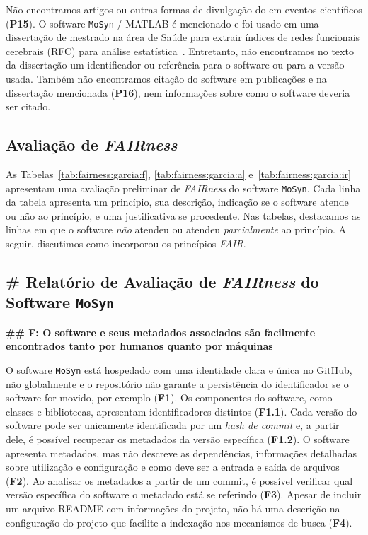 Não encontramos artigos ou outras formas de divulgação do \RSw em eventos científicos (\textbf{P15}). %
O software \texttt{MoSyn} / MATLAB é mencionado e foi usado em uma dissertação de mestrado na área de Saúde
para extrair índices de redes funcionais cerebrais (RFC) para análise estatística~\cite{toutain}. 
Entretanto, não encontramos no texto da dissertação um identificador ou referência para o software ou para a versão usada.
Também não encontramos citação do software em publicações e na dissertação mencionada (\textbf{P16}), nem informações sobre como o software deveria ser citado.

\subsection{Avaliação de \textit{FAIRness}}

As Tabelas~\ref{tab:fairness:garcia:f}, \ref{tab:fairness:garcia:a} e~\ref{tab:fairness:garcia:ir} apresentam uma avaliação preliminar de \textit{FAIRness} do software \texttt{MoSyn}. 
Cada linha da tabela apresenta um princípio, sua descrição, indicação se o software atende ou não ao princípio, e uma justificativa se procedente. Nas tabelas, destacamos as linhas em que o software \textit{não} atendeu ou atendeu \textit{parcialmente} ao princípio.
A seguir, discutimos como \RSw incorporou os princípios \textit{FAIR}.

\subsection*{\# Relatório de Avaliação de \textit{FAIRness} do Software \texttt{MoSyn}}

\noindent \textbf{\#\# F: O software e seus metadados associados são facilmente encontrados tanto por humanos quanto por máquinas}

O software \texttt{MoSyn} está hospedado com uma identidade clara e única no GitHub, não globalmente e o repositório não garante a persistência do identificador se o software for movido, por exemplo (\textbf{F1}). Os componentes do software, como classes e bibliotecas, apresentam identificadores distintos (\textbf{F1.1}).  Cada versão do software pode ser unicamente identificada por um \textit{hash de commit} e, a partir dele, é possível recuperar os metadados da versão específica (\textbf{F1.2}). O software apresenta metadados, mas não descreve as dependências, informações detalhadas sobre utilização e configuração e como deve ser a entrada e saída de arquivos (\textbf{F2}). Ao analisar os metadados a partir de um commit, é possível verificar qual versão específica do software o metadado está se referindo (\textbf{F3}). Apesar de incluir um arquivo README com informações do projeto, não há uma descrição na configuração do projeto que facilite a indexação nos mecanismos de busca (\textbf{F4}).

